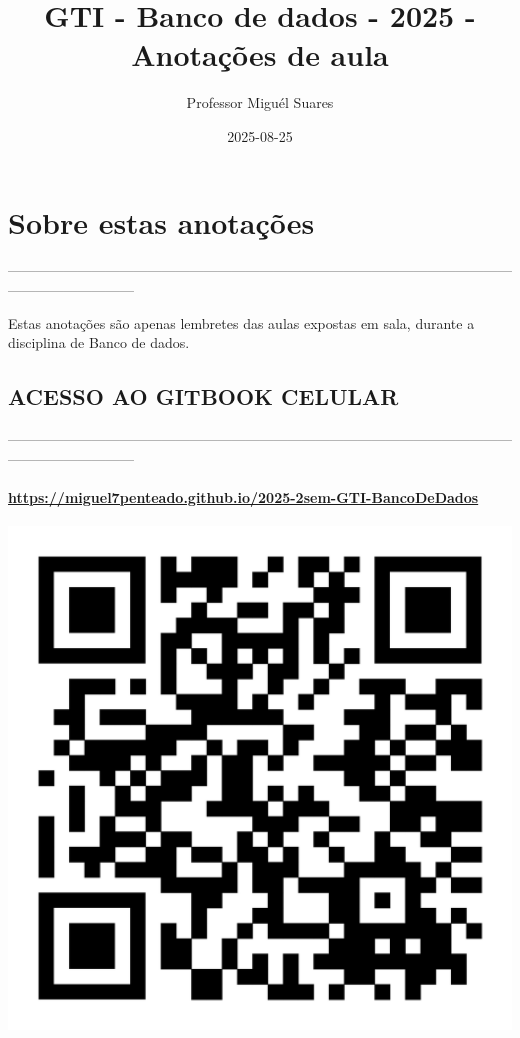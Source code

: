 \documentclass[
]{book}
\title{GTI - Banco de dados - 2025 - Anotações de aula}
\author{Professor Miguél Suares}
\date{2025-08-25}
\begin{document}
\maketitle

{
\setcounter{tocdepth}{1}
\tableofcontents
}
\chapter*{Sobre estas anotações}\label{sobre-estas-anotauxe7uxf5es}

---------------------------------------------------------------------------------------------------------------------------------------

Estas anotações são apenas lembretes das aulas expostas em sala, durante a disciplina de Banco de dados.

\section{ACESSO AO GITBOOK CELULAR}\label{acesso-ao-gitbook-celular}

---------------------------------------------------------------------------------------------------------------------------------------

\subsubsection{\texorpdfstring{\url{https://miguel7penteado.github.io/2025-2sem-GTI-BancoDeDados}}{https://miguel7penteado.github.io/2025-2sem-GTI-BancoDeDados}}\label{httpsmiguel7penteado.github.io2025-2sem-gti-bancodedados}

\includegraphics{images/qr-code-disciplina.jpg}
\end{document}
